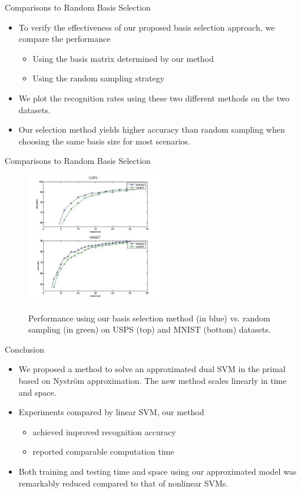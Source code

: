 \documentclass{beamer}
\begin{document}
\begin{frame}{Comparisons to Random Basis Selection}
\begin{itemize}
  \item To verify the effectiveness of our proposed basis selection approach, we compare the performance
\begin{itemize}
  \item Using the basis matrix determined by our method
  \item Using the random sampling strategy
\end{itemize}
\item We plot the recognition rates using these two different methods on the two datasets.
\item Our selection method yields higher accuracy than random sampling when choosing the same basis size for most scenarios.
\end{itemize}

\end{frame}
\begin{frame}{Comparisons to Random Basis Selection}
\begin{figure}[h!]
\centering
\caption{Performance using our basis selection method (in blue) vs. random sampling (in green) on USPS (top) and MNIST (bottom) datasets.}
  \includegraphics[width=6cm]{compare.jpg}
\label{fig:select}
\end{figure}
\end{frame}

\begin{frame}{Conclusion}
\begin{itemize}
  \item We proposed a method to solve an approximated dual SVM in the primal based on Nystr\"om approximation. The new method scales linearly in time and space.
  \item Experiments compared by linear SVM, our method
  \begin{itemize}
    \item achieved improved recognition accuracy
    \item reported comparable computation time
  \end{itemize}
  \item Both training and testing time and space using our approximated model was remarkably reduced compared to that of nonlinear SVMs.
\end{itemize}
\end{frame}
\end{document}
